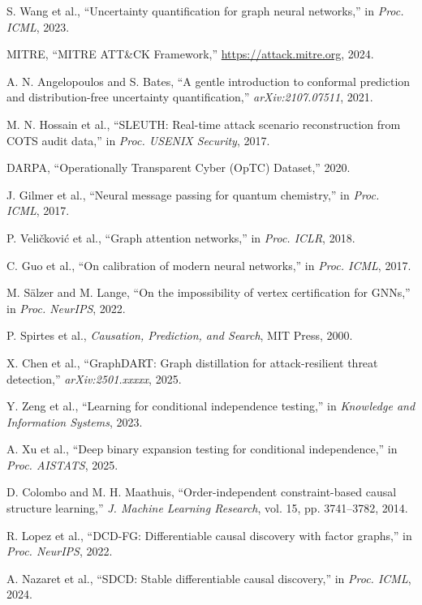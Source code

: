 \documentclass[conference]{IEEEtran}
\begin{document}
\begin{thebibliography}{99}
S. Wang et al., ``Uncertainty quantification for graph neural networks,'' in \emph{Proc. ICML}, 2023.

MITRE, ``MITRE ATT\&CK Framework,'' \url{https://attack.mitre.org}, 2024.

A. N. Angelopoulos and S. Bates, ``A gentle introduction to conformal prediction and distribution-free uncertainty quantification,'' \emph{arXiv:2107.07511}, 2021.

M. N. Hossain et al., ``SLEUTH: Real-time attack scenario reconstruction from COTS audit data,'' in \emph{Proc. USENIX Security}, 2017.

DARPA, ``Operationally Transparent Cyber (OpTC) Dataset,'' 2020.

J. Gilmer et al., ``Neural message passing for quantum chemistry,'' in \emph{Proc. ICML}, 2017.

P. Veličković et al., ``Graph attention networks,'' in \emph{Proc. ICLR}, 2018.

C. Guo et al., ``On calibration of modern neural networks,'' in \emph{Proc. ICML}, 2017.

M. Sälzer and M. Lange, ``On the impossibility of vertex certification for GNNs,'' in \emph{Proc. NeurIPS}, 2022.

P. Spirtes et al., \emph{Causation, Prediction, and Search}, MIT Press, 2000.

X. Chen et al., ``GraphDART: Graph distillation for attack-resilient threat detection,'' \emph{arXiv:2501.xxxxx}, 2025.

Y. Zeng et al., ``Learning for conditional independence testing,'' in \emph{Knowledge and Information Systems}, 2023.

A. Xu et al., ``Deep binary expansion testing for conditional independence,'' in \emph{Proc. AISTATS}, 2025.

D. Colombo and M. H. Maathuis, ``Order-independent constraint-based causal structure learning,'' \emph{J. Machine Learning Research}, vol. 15, pp. 3741--3782, 2014.

R. Lopez et al., ``DCD-FG: Differentiable causal discovery with factor graphs,'' in \emph{Proc. NeurIPS}, 2022.

A. Nazaret et al., ``SDCD: Stable differentiable causal discovery,'' in \emph{Proc. ICML}, 2024.


\end{thebibliography}
\end{document}

